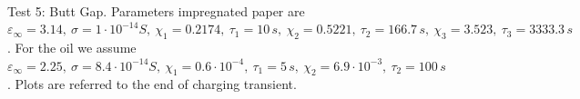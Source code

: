 \documentclass[11pt,a4paper]{article}
\begin{document}
\begin{figure}
{	}\\
	\hspace*{0.0\textwidth}
	\hspace*{0.01\textwidth}
	\caption{Test 5: Butt Gap. Parameters impregnated paper are \(\varepsilon_\infty = 3.14,\ \sigma = 1\cdot 10^{-14}S,\ \chi_1 = 0.2174,\ \tau_1 = 10\,s,\ \chi_2 = 0.5221,\ \tau_2 = 166.7\,s,\ \chi_3 = 3.523,\ \tau_3 = 3333.3\,s\). For the oil we assume \(\varepsilon_\infty = 2.25,\ \sigma = 8.4\cdot 10^{-14}S,\ \chi_1 = 0.6\cdot 10^{-4},\ \tau_1 = 5\,s,\ \chi_2 = 6.9\cdot 10^{-3},\ \tau_2 = 100\,s\). Plots are referred to the end of charging transient.}
	\label{fig:test5}
	
\end{figure}
\end{document}

